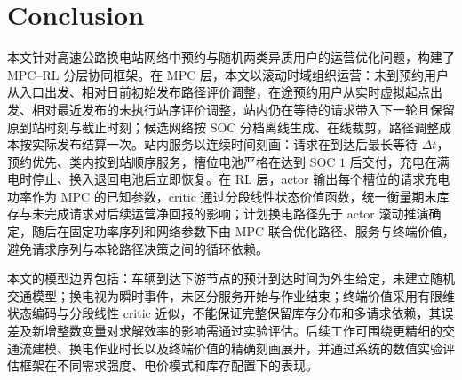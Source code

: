 \documentclass[12pt,a4paper,UTF8]{ctexart}
\begin{document}
\section{Conclusion}

本文针对高速公路换电站网络中预约与随机两类异质用户的运营优化问题，构建了 MPC--RL 分层协同框架。在 MPC 层，本文以滚动时域组织运营：未到预约用户从入口出发、相对日前初始发布路径评价调整，在途预约用户从实时虚拟起点出发、相对最近发布的未执行站序评价调整，站内仍在等待的请求带入下一轮且保留原到站时刻与截止时刻；候选网络按 SOC 分档离线生成、在线裁剪，路径调整成本按实际发布结算一次。站内服务以连续时间刻画：请求在到达后最长等待 $\Delta t$，预约优先、类内按到站顺序服务，槽位电池严格在达到 SOC $1$ 后交付，充电在满电时停止、换入退回电池后立即恢复。在 RL 层，actor 输出每个槽位的请求充电功率作为 MPC 的已知参数，critic 通过分段线性状态价值函数，统一衡量期末库存与未完成请求对后续运营净回报的影响；计划换电路径先于 actor 滚动推演确定，随后在固定功率序列和网络参数下由 MPC 联合优化路径、服务与终端价值，避免请求序列与本轮路径决策之间的循环依赖。

本文的模型边界包括：车辆到达下游节点的预计到达时间为外生给定，未建立随机交通模型；换电视为瞬时事件，未区分服务开始与作业结束；终端价值采用有限维状态编码与分段线性 critic 近似，不能保证完整保留库存分布和多请求依赖，其误差及新增整数变量对求解效率的影响需通过实验评估。后续工作可围绕更精细的交通流建模、换电作业时长以及终端价值的精确刻画展开，并通过系统的数值实验评估框架在不同需求强度、电价模式和库存配置下的表现。



\end{document}
